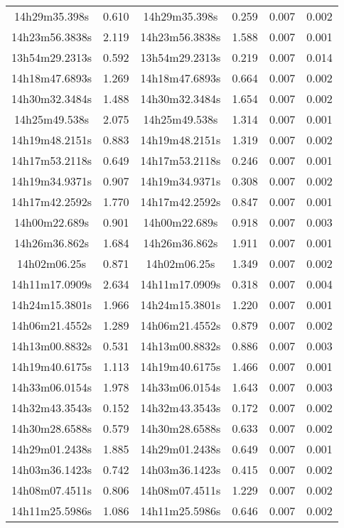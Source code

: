 \begin{table}
\begin{tabular}{cccccc}
14h29m35.398s & 0.610 & 14h29m35.398s & 0.259 & 0.007 & 0.002 \\
14h23m56.3838s & 2.119 & 14h23m56.3838s & 1.588 & 0.007 & 0.001 \\
13h54m29.2313s & 0.592 & 13h54m29.2313s & 0.219 & 0.007 & 0.014 \\
14h18m47.6893s & 1.269 & 14h18m47.6893s & 0.664 & 0.007 & 0.002 \\
14h30m32.3484s & 1.488 & 14h30m32.3484s & 1.654 & 0.007 & 0.002 \\
14h25m49.538s & 2.075 & 14h25m49.538s & 1.314 & 0.007 & 0.001 \\
14h19m48.2151s & 0.883 & 14h19m48.2151s & 1.319 & 0.007 & 0.002 \\
14h17m53.2118s & 0.649 & 14h17m53.2118s & 0.246 & 0.007 & 0.001 \\
14h19m34.9371s & 0.907 & 14h19m34.9371s & 0.308 & 0.007 & 0.002 \\
14h17m42.2592s & 1.770 & 14h17m42.2592s & 0.847 & 0.007 & 0.001 \\
14h00m22.689s & 0.901 & 14h00m22.689s & 0.918 & 0.007 & 0.003 \\
14h26m36.862s & 1.684 & 14h26m36.862s & 1.911 & 0.007 & 0.001 \\
14h02m06.25s & 0.871 & 14h02m06.25s & 1.349 & 0.007 & 0.002 \\
14h11m17.0909s & 2.634 & 14h11m17.0909s & 0.318 & 0.007 & 0.004 \\
14h24m15.3801s & 1.966 & 14h24m15.3801s & 1.220 & 0.007 & 0.001 \\
14h06m21.4552s & 1.289 & 14h06m21.4552s & 0.879 & 0.007 & 0.002 \\
14h13m00.8832s & 0.531 & 14h13m00.8832s & 0.886 & 0.007 & 0.003 \\
14h19m40.6175s & 1.113 & 14h19m40.6175s & 1.466 & 0.007 & 0.001 \\
14h33m06.0154s & 1.978 & 14h33m06.0154s & 1.643 & 0.007 & 0.003 \\
14h32m43.3543s & 0.152 & 14h32m43.3543s & 0.172 & 0.007 & 0.002 \\
14h30m28.6588s & 0.579 & 14h30m28.6588s & 0.633 & 0.007 & 0.002 \\
14h29m01.2438s & 1.885 & 14h29m01.2438s & 0.649 & 0.007 & 0.001 \\
14h03m36.1423s & 0.742 & 14h03m36.1423s & 0.415 & 0.007 & 0.002 \\
14h08m07.4511s & 0.806 & 14h08m07.4511s & 1.229 & 0.007 & 0.002 \\
14h11m25.5986s & 1.086 & 14h11m25.5986s & 0.646 & 0.007 & 0.002 \\

\end{tabular}
\end{table}
